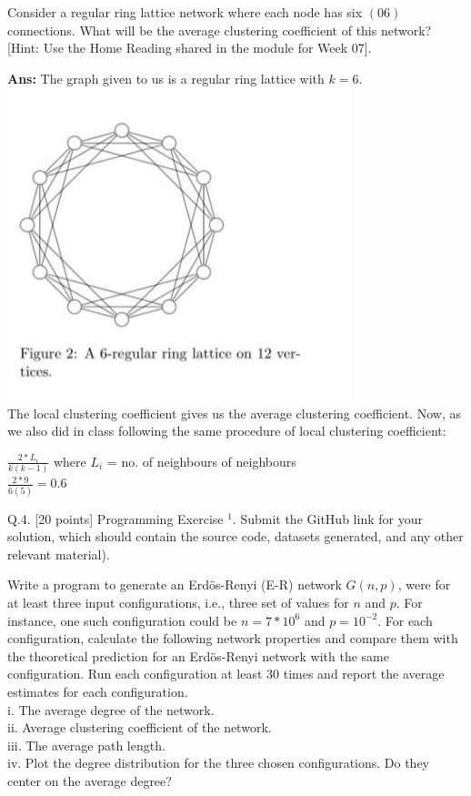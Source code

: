 \documentclass[answers]{exam}
\begin{document}
\begin{questions}
\begin{framed}
\end{framed}

    \question [10 points] Consider a regular ring lattice network where each node has six $(06)$ connections. What will be the average clustering coefficient of this network? [Hint: Use the Home Reading shared in the module for Week 07].
    
\begin{framed}
\newpage
\textbf{Ans:} 
The graph given to us is a regular ring lattice with $k=6$.\\
\includegraphics[width=10cm]{q3.jpeg}\\
The local clustering coefficient gives us the average clustering coefficient. Now, as we also did in class following the same procedure of local clustering coefficient:
\begin{center}
    $\frac{2 * L_i}{k(k-1)}$ where $L_i$ = no. of neighbours of neighbours\\
    $\frac{2*9}{6(5)} = 0.6$
\end{center}





\end{framed}

\question Q.4. [20 points] Programming Exercise $^{1}$. Submit the GitHub link for your solution, which should contain the source code, datasets generated, and any other relevant material).

Write a program to generate an Erdös-Renyi (E-R) network $G(n, p)$, were for at least three input configurations, i.e., three set of values for $n$ and $p$. For instance, one such configuration could be $n=7 * 10^{6}$ and $p=10^{-2}$. For each configuration, calculate the following network properties and compare them with the theoretical prediction for an Erdös-Renyi network with the same configuration. Run each configuration at least 30 times and report the average estimates for each configuration.\\
i. The average degree of the network.\\
ii. Average clustering coefficient of the network.\\
iii. The average path length.\\
iv. Plot the degree distribution for the three chosen configurations. Do they center on the average degree?\\


\end{questions}
\end{document}
